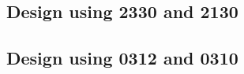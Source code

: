 \subsection{Design using 2330 and 2130}


 \begin{center}




 \end{center}



\subsection{Design using 0312 and 0310}


 \begin{center}




 \end{center}



